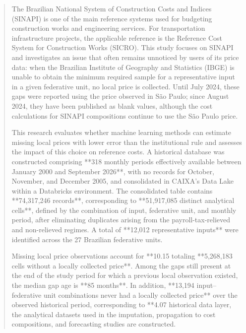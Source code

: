 
\begin{abstract}
The Brazilian National System of Construction Costs and Indices (SINAPI) is one of the 
main reference systems used for budgeting construction works and engineering services. 
For transportation infrastructure projects, the applicable reference is the Reference 
Cost System for Construction Works (SICRO). This study focuses on SINAPI and investigates 
an issue that often remains unnoticed by users of its price data: when the Brazilian 
Institute of Geography and Statistics (IBGE) is unable to obtain the minimum required 
sample for a representative input in a given federative unit, no local price is collected. 
Until July 2024, these gaps were reported using the price observed in São Paulo; since 
August 2024, they have been published as blank values, although the cost calculations 
for SINAPI compositions continue to use the São Paulo price.

This research evaluates whether machine learning methods can estimate missing local 
prices with lower error than the institutional rule and assesses the impact of this 
choice on reference costs. A historical database was constructed comprising **318 monthly 
periods effectively available between January 2000 and September 2026**, with no records 
for October, November, and December 2005, and consolidated in CAIXA’s Data Lake within a 
Databricks environment. The consolidated table contains **74,317,246 records**, 
corresponding to **51,917,085 distinct analytical cells**, defined by the combination of 
input, federative unit, and monthly period, after eliminating duplicates arising from the 
payroll-tax-relieved and non-relieved regimes. A total of **12,012 representative inputs** 
were identified across the 27 Brazilian federative units.

Missing local price observations account for **10.15%
totaling **5,268,183 cells without a locally collected price**. Among the gaps still 
present at the end of the study period for which a previous local observation existed, 
the median gap age is **85 months**. In addition, **13,194 input–federative unit combinations 
never had a locally collected price** over the observed historical period, corresponding 
to **4.07%
historical data layer, the analytical datasets used in the imputation, propagation to 
cost compositions, and forecasting studies are constructed.


\end{abstract}
